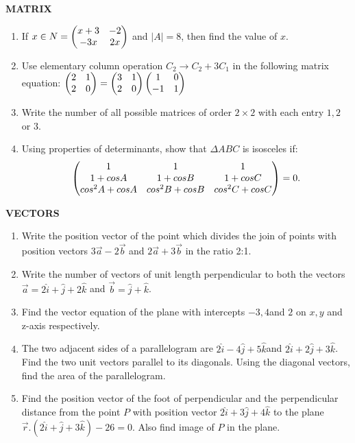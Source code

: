 \documentclass[12pt,-letter paper]{article}
\begin{document}
\begin{center}                                                              \textbf{MATRIX}                                                     \end{center}  
\begin{enumerate}


\item If $x \in N=\begin{pmatrix}x+3&-2\\ -3x&2x\end{pmatrix}$ and $|A|=8$, then find the value of $x$.
\item Use elementary column operation $C_2\rightarrow C_2+3C_1$ in the following matrix equation: 
	$\begin{pmatrix}2&1\\2&0\end{pmatrix}=\begin{pmatrix}3&1\\2&0\end{pmatrix}\begin{pmatrix}1&0\\-1&1\end{pmatrix}$
\item Write the number of all possible matrices of order $2\times2$ with each entry $1, 2$ or $3$.
\item Using properties of determinants, show that $\Delta ABC$ is isosceles if: 
	\begin{align}\begin{pmatrix}1&1&1\\ 1+cosA&1+cosB&1+cosC\\ cos^{2}A+cosA&cos^{2}B+cosB&cos^{2}C+cosC\end{pmatrix}=0.\end{align}
		\end{enumerate}
		\begin{center}
			\textbf{VECTORS}
		\end{center}
\begin{enumerate}
\item Write the position vector of the point which divides the join of points with position vectors 
$3\vec{a}-2\vec{b}$ and $2\vec{a}+3\vec{b}$ in the ratio 2:1. 
\item Write the number of vectors of unit length perpendicular to both the vectors $\vec{a}=2\hat{i}+\hat{j}+2\hat{k}$ and $\vec{b}=\hat{j}+\hat{k}$. 
\item Find the vector equation of the plane with intercepts $-3, 4 $and $2$ on $x, y$ and z-axis respectively.
\item The two adjacent sides of a parallelogram are $2\hat{i} - 4\hat{j} + 5\hat{k} $and $2\hat{i} + 2\hat{j} + 3\hat{k}$. Find the two unit vectors parallel to its diagonals. Using the diagonal vectors, find the area of the parallelogram.
\item Find the position vector of the foot of perpendicular and the perpendicular distance from the point $P$ with position vector $2\hat{i}+3\hat{j}+4\hat{k}$ to the plane $\vec{r }.(2\hat{i}+\hat{j}+3\hat{k})-26=0$. Also find image of $P$ in the plane.
\end{enumerate}
\end{document}
